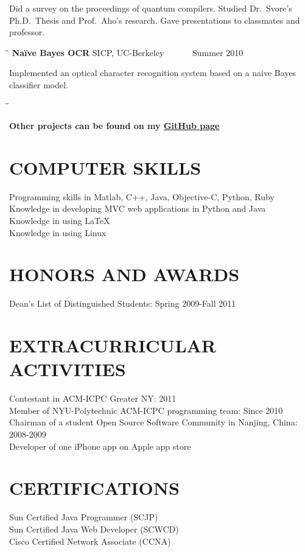 \documentclass{res}
\begin{document}
\begin{resume}
    Did a survey on the proceedings of quantum compilers. Studied Dr.\ Svore's Ph.D.\ Thesis and Prof.\ Aho's research. Gave presentations to classmates and  professor.
      \begin{tabbing}%
   \hspace{2.3in}\= \hspace{2.6in}\= \kill %
   {\bf Na\"{i}ve Bayes OCR}  \>SICP, UC-Berkeley\> ~~~~~~Summer 2010\\
   \end{tabbing}\vspace{-20pt}
    Implemented an optical character recognition system based on a naive Bayes classifier model. 
    \begin{tabbing}
   \hspace{2.3in}\= \hspace{2.6in}\= \kill %
 
    {\bf Other projects can be found on my \href{https://github.com/tingleshao}{\underline{GitHub page}}} 
  \end{tabbing}
  
  

\section{COMPUTER SKILLS}          
    Programming skills in Matlab, C++, Java, Objective-C, Python, Ruby  \\
    Knowledge in developing MVC web applications in Python and Java\\
    Knowledge in using \LaTeX \\
    Knowledge in using Linux
  
 
\section{HONORS AND AWARDS}          
    Dean's List of Distinguished Students: Spring 2009-Fall 2011  \\       
     
\section{EXTRACURRICULAR ACTIVITIES}          
    Contestant in ACM-ICPC Greater NY: 2011\\
    Member of NYU-Polytechnic ACM-ICPC programming team: Since 2010\\         
    Chairman of a student Open Source Software Community in Nanjing, China: 2008-2009 \\        
    Developer of one iPhone app on Apple app store
    
 \section{CERTIFICATIONS}          
    Sun Certified Java Programmer (SCJP)\\
    Sun Certified Java Web Developer (SCWCD)\\         
    Cisco Certified Network Associate  (CCNA)\\     
  
\end{resume}
\end{document}
